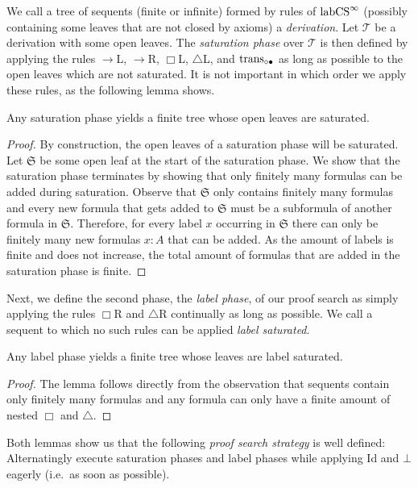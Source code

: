 \documentclass[runningheads,orivec]{llncs}
\newcommand{\labCS}{{\textnormal{labCS}^\infty}}
\newcommand{\transBi}{\textnormal{trans}_{\circ \bullet}}
\newcommand{\Seq}{\mathfrak{S}}
\newcommand{\tree}{\mathcal{T}}
\begin{document}
We call a tree of sequents (finite or infinite) formed by rules of $\labCS$ (possibly containing some leaves that are not closed by axioms) a \emph{derivation}.
Let $\tree$ be a derivation with some open leaves. The \emph{saturation phase} over $\tree$ is then defined by applying the rules $\to$L, $\to$R, $\Box$L, $\triangle$L, and $\transBi$ as long as possible to the open leaves which are not saturated.
It is not important in which order we apply these rules, as the following lemma shows.

\begin{lemma} \label{lem:sat}
    Any saturation phase yields a finite tree whose open leaves are saturated.
\end{lemma}
\begin{proof}
    By construction, the open leaves of a saturation phase will be saturated. Let $\Seq$ be some open leaf at the start of the saturation phase.
We show that the saturation phase terminates by showing that only finitely many formulas can be added during saturation. 
Observe that $\Seq $ only contains finitely many formulas and every new formula that gets added to $\Seq $ must be a subformula of another formula in $\Seq $. Therefore, for every label $x$ occurring in $\Seq $ there can only be finitely many new formulas $x:A$ that can be added. As the amount of labels is finite and does not increase, the total amount of formulas that are added in the saturation phase is finite. 
\end{proof}

Next, we define the second phase, the \emph{label phase}, of our proof search as simply applying the rules $\Box$R and $\triangle$R continually as long as possible. 
We call a sequent to which no such rules can be applied \emph{label saturated}.

\begin{lemma}
    Any label phase yields a finite tree whose leaves are label saturated.
\end{lemma}
\begin{proof}
    The lemma follows directly from the observation that sequents contain only finitely many formulas and any formula can only have a finite amount of nested $\Box$ and $\triangle$.
\end{proof}

Both lemmas show us that the following \emph{proof search strategy} is well defined:
Alternatingly execute saturation phases and label phases while applying Id and $\bot$ eagerly (i.e.~as soon as possible). 
\end{document}
